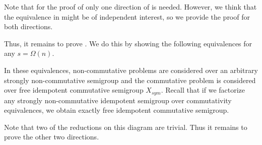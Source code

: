 \documentclass{toc}
\begin{document}
Note that for the proof of  only one direction of
 is needed. However, we think that the equivalence
in  might be of independent interest, so we provide
the proof for both directions.

Thus, it remains to prove . We do this by showing
the following equivalences for any $s = \Omega(n)$.

\vspace{2mm}
\begin{center}
\end{center}
\vspace{2mm}

In these equivalences, non-commutative problems are considered over an arbitrary
strongly non-commutative semigroup and the commutative problem is considered
over free idempotent commutative semigroup $X_{sym}$. Recall that
if we factorize any strongly non-commutative idempotent semigroup over
commutativity equivalences, we obtain exactly free idempotent commutative
semigroup.

Note that two of the reductions on this diagram are trivial. Thus it remains to prove the other two directions.

%
%
\end{document}
